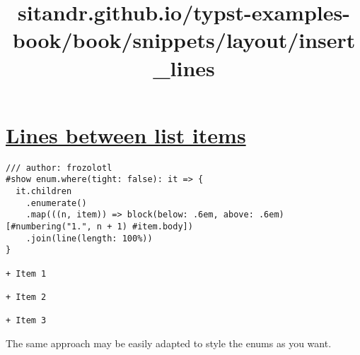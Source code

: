 \title{sitandr.github.io/typst-examples-book/book/snippets/layout/insert_lines}

\section{\texorpdfstring{\hyperref[lines-between-list-items]{Lines
between list
items}}{Lines between list items}}\label{lines-between-list-items}

\begin{verbatim}
/// author: frozolotl
#show enum.where(tight: false): it => {
  it.children
    .enumerate()
    .map(((n, item)) => block(below: .6em, above: .6em)[#numbering("1.", n + 1) #item.body])
    .join(line(length: 100%))
}

+ Item 1

+ Item 2

+ Item 3
\end{verbatim}

\pandocbounded{}

The same approach may be easily adapted to style the enums as you want.
